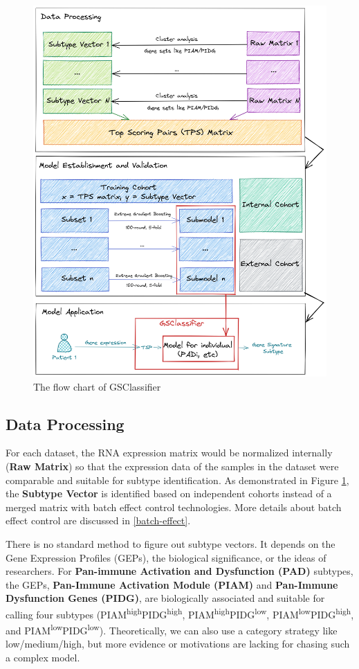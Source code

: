 \documentclass[
  12pt,
]{book}
\begin{document}
\begin{figure}

{\centering \includegraphics[width=0.9\linewidth]{./fig/flowchart} 

}

\caption{The flow chart of GSClassifier}\label{fig:flowchart}
\end{figure}

\hypertarget{data-processing}{%
\subsection{Data Processing}\label{data-processing}}

For each dataset, the RNA expression matrix would be normalized internally (\textbf{Raw Matrix}) so that the expression data of the samples in the dataset were comparable and suitable for subtype identification. As demonstrated in Figure \ref{fig:flowchart}, the \textbf{Subtype Vector} is identified based on independent cohorts instead of a merged matrix with batch effect control technologies. More details about batch effect control are discussed in \ref{batch-effect}.

There is no standard method to figure out subtype vectors. It depends on the Gene Expression Profiles (GEPs), the biological significance, or the ideas of researchers. For \textbf{Pan-immune Activation and Dysfunction (PAD)} subtypes, the GEPs, \textbf{Pan-Immune Activation Module (PIAM)} and \textbf{Pan-Immune Dysfunction Genes (PIDG)}, are biologically associated and suitable for calling four subtypes (PIAM\textsuperscript{high}PIDG\textsuperscript{high}, PIAM\textsuperscript{high}PIDG\textsuperscript{low}, PIAM\textsuperscript{low}PIDG\textsuperscript{high}, and PIAM\textsuperscript{low}PIDG\textsuperscript{low}). Theoretically, we can also use a category strategy like low/medium/high, but more evidence or motivations are lacking for chasing such a complex model.
\end{document}
